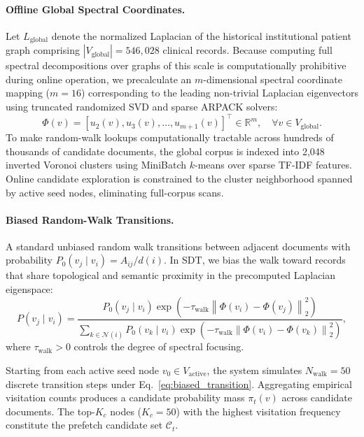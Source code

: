 \documentclass[10pt, onecolumn]{article}
\newcommand{\R}{\mathbb{R}}
\newcommand{\norm}[1]{\left\lVert#1\right\rVert}
\begin{document}
\paragraph{Offline Global Spectral Coordinates.}
Let $L_{\text{global}}$ denote the normalized Laplacian of the historical institutional patient graph comprising $|V_{\text{global}}| = 546{,}028$ clinical records. Because computing full spectral decompositions over graphs of this scale is computationally prohibitive during online operation, we precalculate an $m$-dimensional spectral coordinate mapping ($m=16$) corresponding to the leading non-trivial Laplacian eigenvectors \cite{belkin2003laplacian} using truncated randomized SVD and sparse ARPACK solvers:
\begin{equation}
  \Phi(v) = [u_2(v), u_3(v), \dots, u_{m+1}(v)]^\top \in \R^m, \quad \forall v \in V_{\text{global}}.
  \label{eq:spectral_coords}
\end{equation}
To make random-walk lookups computationally tractable across hundreds of thousands of candidate documents, the global corpus is indexed into 2{,}048 inverted Voronoi clusters using MiniBatch $k$-means over sparse TF-IDF features. Online candidate exploration is constrained to the cluster neighborhood spanned by active seed nodes, eliminating full-corpus scans.

\paragraph{Biased Random-Walk Transitions.}
A standard unbiased random walk transitions between adjacent documents with probability $P_0(v_j \mid v_i) = A_{ij}/d(i)$. In SDT, we bias the walk toward records that share topological and semantic proximity in the precomputed Laplacian eigenspace:
\begin{equation}
  P(v_j \mid v_i) = \frac{P_0(v_j \mid v_i) \exp\!\left( -\tau_{\text{walk}} \norm{\Phi(v_i) - \Phi(v_j)}_2^2 \right)}{\sum_{k \in \mathcal{N}(i)} P_0(v_k \mid v_i) \exp\!\left( -\tau_{\text{walk}} \norm{\Phi(v_i) - \Phi(v_k)}_2^2 \right)},
  \label{eq:biased_transition}
\end{equation}
where $\tau_{\text{walk}} > 0$ controls the degree of spectral focusing.

Starting from each active seed node $v_0 \in V_{\text{active}}$, the system simulates $N_{\text{walk}} = 50$ discrete transition steps under Eq.~\eqref{eq:biased_transition}. Aggregating empirical visitation counts produces a candidate probability mass $\pi_t(v)$ across candidate documents. The top-$K_c$ nodes ($K_c = 50$) with the highest visitation frequency constitute the prefetch candidate set $\mathcal{C}_t$.
\end{document}
